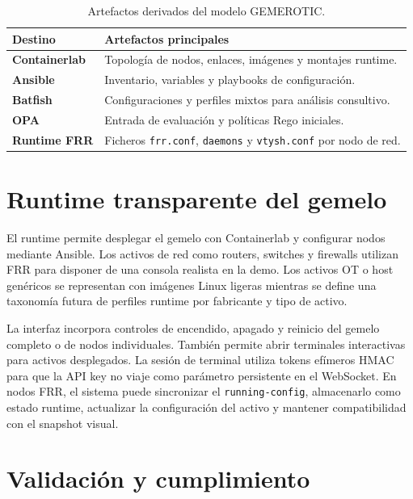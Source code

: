 \begin{table}[H]
    \centering
    \small
    \renewcommand{\arraystretch}{1.35}
    \begin{tabularx}{\textwidth}{>{\bfseries}p{3.3cm}X}
        \toprule
        Destino & Artefactos principales \\
        \midrule
        Containerlab & Topología de nodos, enlaces, imágenes y montajes runtime. \\
        Ansible & Inventario, variables y playbooks de configuración. \\
        Batfish & Configuraciones y perfiles mixtos para análisis consultivo. \\
        OPA & Entrada de evaluación y políticas Rego iniciales. \\
        Runtime FRR & Ficheros \texttt{frr.conf}, \texttt{daemons} y \texttt{vtysh.conf} por nodo de red. \\
        \bottomrule
    \end{tabularx}
    \caption{Artefactos derivados del modelo GEMEROTIC.}
    \label{tab:artefactos-derivados}
\end{table}

\section{Runtime transparente del gemelo} \label{sec:runtime-transparente}

El runtime permite desplegar el gemelo con Containerlab y configurar nodos mediante Ansible. Los activos de red como routers, switches y firewalls utilizan FRR para disponer de una consola realista en la demo. Los activos OT o host genéricos se representan con imágenes Linux ligeras mientras se define una taxonomía futura de perfiles runtime por fabricante y tipo de activo.

La interfaz incorpora controles de encendido, apagado y reinicio del gemelo completo o de nodos individuales. También permite abrir terminales interactivas para activos desplegados. La sesión de terminal utiliza tokens efímeros HMAC para que la API key no viaje como parámetro persistente en el WebSocket. En nodos FRR, el sistema puede sincronizar el \texttt{running-config}, almacenarlo como estado runtime, actualizar la configuración del activo y mantener compatibilidad con el snapshot visual.

\section{Validación y cumplimiento} \label{sec:compliance-ia}

